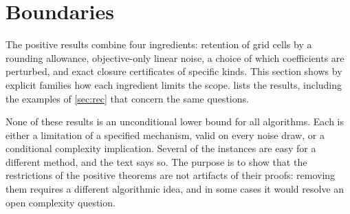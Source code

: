 \section{Boundaries}\label{sec:lim}

The positive results combine four ingredients: retention of grid cells by a
rounding allowance, objective-only linear noise, a choice of which
coefficients are perturbed, and exact closure certificates of specific
kinds. This section shows by explicit families how each ingredient limits
the scope.  lists the results, including the examples
of \cref{sec:rec} that concern the same questions.

None of these results is an unconditional lower bound for all algorithms.
Each is either a limitation of a specified mechanism, valid on every noise
draw, or a conditional complexity implication. Several of the instances are
easy for a different method, and the text says so. The purpose is to show
that the restrictions of the positive theorems are not artifacts of their
proofs: removing them requires a different algorithmic idea, and in some
cases it would resolve an open complexity question.

